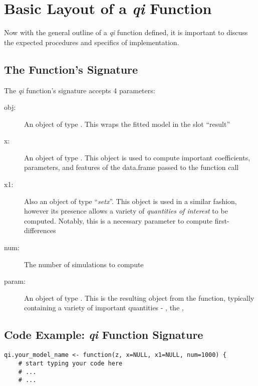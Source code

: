 %
\section{Basic Layout of a \emph{qi} Function}
Now with the general outline of a \emph{qi} function defined, it is
important to discuss the expected procedures and specifics of
implementation.


\subsection{The Function's Signature}
The \emph{qi} function's signature accepts 4 parameters:


%
%
\begin{description}

	\item[obj:] An object of type .  This wraps the fitted
		model in the slot ``result''
		
	\item[x:] An object of type .  This object is used to compute
		important coefficients, parameters, and features of the data.frame passed to
		the function call

	\item[x1:] Also an object of type ``\emph{setx}''.  This object is used in a
		similar fashion, however its presence allows a variety of \emph{quantities
		of interest} to be computed.  Notably, this is a necessary parameter to
		compute first-differences
	
	\item[num:] The number of simulations to compute

	\item[param:] An object of type . This is the resulting object from
		the  function, typically containing a variety of important quantities
		- , the , \code{}

\end{description}


%
\subsection{Code Example: \emph{qi} Function Signature}
\begin{verbatim}
qi.your_model_name <- function(z, x=NULL, x1=NULL, num=1000) {
	# start typing your code here
	# ...
	# ...
\end{verbatim}


